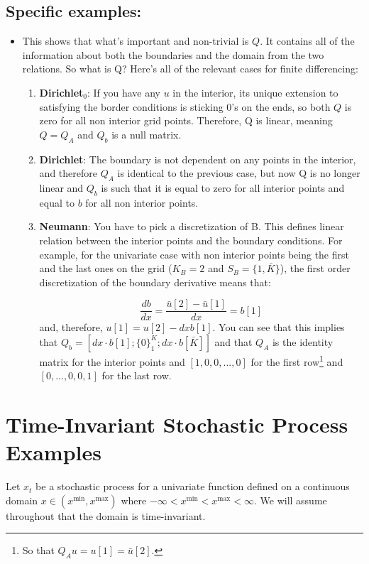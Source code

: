 \documentclass[11pt]{article}
\begin{document}
	\subsection{Specific examples:}
	\begin{itemize}
		\item This shows that what's important and non-trivial is $Q$. It contains all of the information about both the boundaries and the domain from the two relations. So what is Q? Here's all of the relevant cases for finite differencing:
		\begin{enumerate}
			\item \textbf{Dirichlet$_0$}: If you have any $u$ in the interior, its unique extension to satisfying the border conditions is sticking $0$'s on the ends, so both $Q$ is zero for all non interior grid points. Therefore, Q is linear, meaning $Q = Q_A$ and $Q_b$ is a null matrix.

			\item \textbf{Dirichlet}: The boundary is not dependent on any points in the interior, and therefore $Q_A$ is identical to the previous case, but now Q is no longer linear and
	 		$Q_b$ is such that it is equal to zero for all interior points and equal to $b$ for all non interior points.

			\item \textbf{Neumann}: You have to pick a discretization of B. This defines linear relation between the interior points and the boundary conditions. For example, for the univariate case with non interior points being the first and the last ones on the grid ($K_B = 2$ and $S_B = \{1,\bar{K}\}$), the first order discretization of the boundary derivative means that:

			\begin{equation}
				\frac{db}{dx} = \frac{\bar{u}[2] - \bar{u}[1]}{dx} = b[1]
			\end{equation}
			and, therefore, $u[1] = u[2] - dx b[1]$. You can see that this implies that $Q_b = [dx\cdot b[1];\{0\}_1^K;dx\cdot b[\bar{K}]]$ and that $Q_A$ is the identity matrix for the interior points and $[1,0, 0,...,0]$ for the first row\footnote{So that $Q_A u = u[1] = \bar{u}[2]$.} and $[0,...,0,0,1]$ for the last row.%

		\end{enumerate}
	\end{itemize}

\section{Time-Invariant Stochastic Process Examples}
Let $x_t$ be a stochastic process for a univariate function defined on a continuous domain $x \in (x^{\min}, x^{\max})$ where $-\infty < x^{\min} < x^{\max} < \infty$.  We will assume throughout that the domain is time-invariant.
\end{document}
